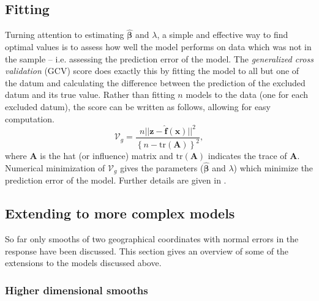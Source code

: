 \subsection{Fitting}
\label{GAMfitting}

Turning attention to estimating $\bm{\hat{\beta}}$ and $\lambda$, a simple and effective way to find optimal values is to assess how well the model performs on data which was not in the sample -- i.e. assessing the prediction error of the model. The \textit{generalized cross validation} (GCV) score does exactly this by fitting the model to all but one of the datum and calculating the difference between the prediction of the excluded datum and its true value. Rather than fitting $n$ models to the data (one for each excluded datum), the score can be written as follows, allowing for easy computation.
\begin{equation}
\mathcal{V}_g = \frac{n \lvert\lvert \mathbf{z} - \mathbf{\hat{f}}(\mathbf{x})\rvert \rvert^2}{\left \{n-\text{tr}(\mathbf{A}) \right \}^2},
\label{intro-GCV}
\end{equation}
where $\mathbf{A}$ is the hat (or influence) matrix and $\text{tr}(\mathbf{A})$ indicates the trace of $\mathbf{A}$. Numerical minimization of $\mathcal{V}_g$ gives the parameters ($\bm{\hat{\beta}}$ and $\lambda$) which minimize the prediction error of the model. Further details are given in . 



\subsection{Extending to more complex models}
\label{intro-extending}

So far only smooths of two geographical coordinates with normal errors in the response have been discussed. This section gives an overview of some of the extensions to the models discussed above.

\subsubsection{Higher dimensional smooths}

